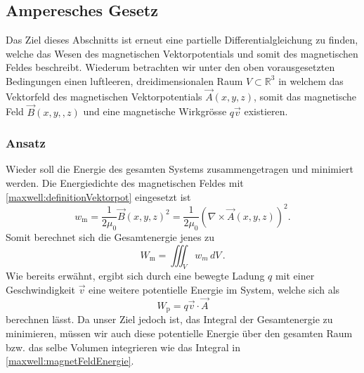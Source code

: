 

\subsection{Amperesches Gesetz}
Das Ziel dieses Abschnitts ist erneut eine partielle Differentialgleichung zu finden, welche das Wesen des magnetischen Vektorpotentials und somit des magnetischen Feldes beschreibt.
Wiederum betrachten wir unter den oben vorausgesetzten Bedingungen einen luftleeren, dreidimensionalen Raum $V \subset \mathbb{R}^3$ in welchem das Vektorfeld des magnetischen Vektorpotentials $\vec{A}(x,y,z)$, somit das magnetische Feld $\vec{B}(x,y,,z)$ und eine magnetische Wirkgrösse $q\vec{v}$  existieren. 

\subsubsection{Ansatz}

Wieder soll die Energie des gesamten Systems zusammengetragen und minimiert werden. 
Die Energiedichte des magnetischen Feldes mit \eqref{maxwell:definitionVektorpot} eingesetzt ist
\[ w_{\text{m}} 
= 
\frac{1}{2\mu_0}\vec{B}(x,y,z)^2
=
\frac{1}{2\mu_0}\left(\nabla\times\vec{A}(x,y,z)\right)^2. \]
Somit berechnet sich die Gesamtenergie jenes zu 
\begin{equation}
	\label{maxwell:magnetFeldEnergie}
	W_{\text{m}} = \iiint_V w_m\, dV\,.
\end{equation}
Wie bereits erwähnt, ergibt sich durch eine bewegte Ladung $q$ mit einer Geschwindigkeit $\vec{v}$ eine weitere potentielle Energie im System, welche sich als 
\[ 
W_{\text{p}}
= 
q\vec{v}
\cdot
\vec{A}
 \]
berechnen lässt.
Da unser Ziel jedoch ist, das Integral der Gesamtenergie zu minimieren, müssen wir auch diese potentielle Energie über den gesamten Raum bzw. das selbe Volumen integrieren wie das Integral in \eqref{maxwell:magnetFeldEnergie}. 

